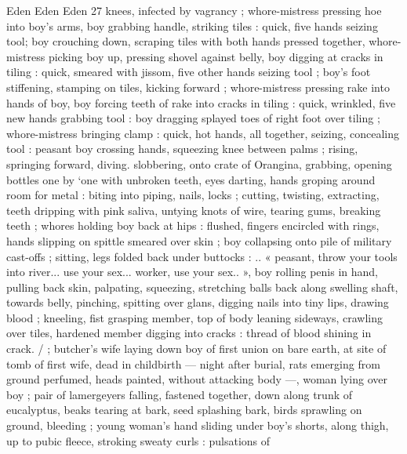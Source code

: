 Eden Eden Eden 27
knees, infected by vagrancy ; whore-mistress pressing hoe into boy's
arms, boy grabbing handle, striking tiles : quick, five hands seizing
tool; boy crouching down, scraping tiles with both hands pressed
together, whore-mistress picking boy up, pressing shovel against
belly, boy digging at cracks in tiling : quick, smeared with jissom, five
other hands seizing tool ; boy's foot stiffening, stamping on tiles,
kicking forward ; whore-mistress pressing rake into hands of boy,
boy forcing teeth of rake into cracks in tiling : quick, wrinkled, five
new hands grabbing tool : boy dragging splayed toes of right foot
over tiling ; whore-mistress bringing clamp : quick, hot hands, all
together, seizing, concealing tool : peasant boy crossing hands,
squeezing knee between palms ; rising, springing forward, diving.
slobbering, onto crate of Orangina, grabbing, opening bottles one by
‘one with unbroken teeth, eyes darting, hands groping around room
for metal : biting into piping, nails, locks ; cutting, twisting,
extracting, teeth dripping with pink saliva, untying knots of wire,
tearing gums, breaking teeth ; whores holding boy back at hips :
flushed, fingers encircled with rings, hands slipping on spittle
smeared over skin ; boy collapsing onto pile of military cast-offs ;
sitting, legs folded back under buttocks : .. « peasant, throw your
tools into river... use your sex... worker, use your sex.. », boy rolling
penis in hand, pulling back skin, palpating, squeezing, stretching
balls back along swelling shaft, towards belly, pinching, spitting over
glans, digging nails into tiny lips, drawing blood ; kneeling, fist
grasping member, top of body leaning sideways, crawling over tiles,
hardened member digging into cracks : thread of blood shining in
crack. / ; butcher's wife laying down boy of first union on bare earth,
at site of tomb of first wife, dead in childbirth — night after burial,
rats emerging from ground perfumed, heads painted, without
attacking body —, woman lying over boy ; pair of lamergeyers
falling, fastened together, down along trunk of eucalyptus, beaks
tearing at bark, seed splashing bark, birds sprawling on ground,
bleeding ; young woman's hand sliding under boy's shorts, along
thigh, up to pubic fleece, stroking sweaty curls : pulsations of

